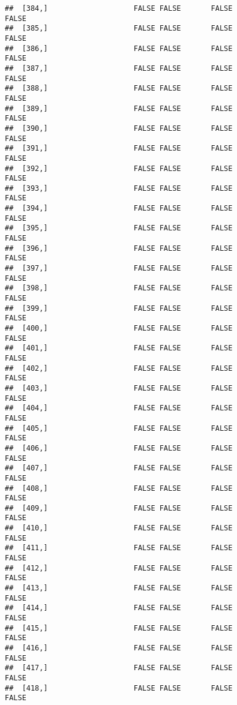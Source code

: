\documentclass[
]{article}
\begin{document}
\begin{verbatim}
##  [384,]                    FALSE FALSE       FALSE                FALSE
##  [385,]                    FALSE FALSE       FALSE                FALSE
##  [386,]                    FALSE FALSE       FALSE                FALSE
##  [387,]                    FALSE FALSE       FALSE                FALSE
##  [388,]                    FALSE FALSE       FALSE                FALSE
##  [389,]                    FALSE FALSE       FALSE                FALSE
##  [390,]                    FALSE FALSE       FALSE                FALSE
##  [391,]                    FALSE FALSE       FALSE                FALSE
##  [392,]                    FALSE FALSE       FALSE                FALSE
##  [393,]                    FALSE FALSE       FALSE                FALSE
##  [394,]                    FALSE FALSE       FALSE                FALSE
##  [395,]                    FALSE FALSE       FALSE                FALSE
##  [396,]                    FALSE FALSE       FALSE                FALSE
##  [397,]                    FALSE FALSE       FALSE                FALSE
##  [398,]                    FALSE FALSE       FALSE                FALSE
##  [399,]                    FALSE FALSE       FALSE                FALSE
##  [400,]                    FALSE FALSE       FALSE                FALSE
##  [401,]                    FALSE FALSE       FALSE                FALSE
##  [402,]                    FALSE FALSE       FALSE                FALSE
##  [403,]                    FALSE FALSE       FALSE                FALSE
##  [404,]                    FALSE FALSE       FALSE                FALSE
##  [405,]                    FALSE FALSE       FALSE                FALSE
##  [406,]                    FALSE FALSE       FALSE                FALSE
##  [407,]                    FALSE FALSE       FALSE                FALSE
##  [408,]                    FALSE FALSE       FALSE                FALSE
##  [409,]                    FALSE FALSE       FALSE                FALSE
##  [410,]                    FALSE FALSE       FALSE                FALSE
##  [411,]                    FALSE FALSE       FALSE                FALSE
##  [412,]                    FALSE FALSE       FALSE                FALSE
##  [413,]                    FALSE FALSE       FALSE                FALSE
##  [414,]                    FALSE FALSE       FALSE                FALSE
##  [415,]                    FALSE FALSE       FALSE                FALSE
##  [416,]                    FALSE FALSE       FALSE                FALSE
##  [417,]                    FALSE FALSE       FALSE                FALSE
##  [418,]                    FALSE FALSE       FALSE                FALSE

\end{verbatim}
\end{document}
